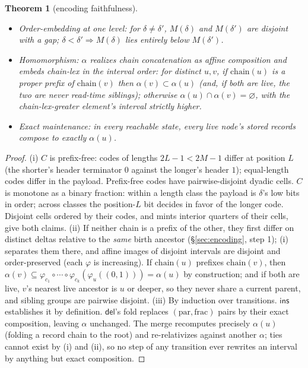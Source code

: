 \documentclass[11pt]{article}
\newtheorem{theorem}{Theorem}
\newcommand{\del}{\mathsf{del}}
\newcommand{\ins}{\mathsf{ins}}
\newcommand{\chain}{\mathrm{chain}}
\begin{document}
\begin{theorem}[encoding faithfulness]\label{thm:faithful}
\begin{itemize}
\item[(i)] \emph{Order-embedding at one level:} for $\delta \ne
\delta'$, $M(\delta)$ and $M(\delta')$ are disjoint with a gap;
$\delta < \delta' \Rightarrow M(\delta)$ lies entirely below
$M(\delta')$.
\item[(ii)] \emph{Homomorphism:} $\alpha$ realizes chain
concatenation as affine composition and embeds chain-lex in the
interval order: for distinct $u, v$, if $\chain(u)$ is a proper
prefix of $\chain(v)$ then $\alpha(v) \subset \alpha(u)$ (and, if
both are live, the two are never read-time siblings); otherwise
$\alpha(u) \cap \alpha(v) = \varnothing$, with the chain-lex-greater
element's interval strictly higher.
\item[(iii)] \emph{Exact maintenance:} in every reachable state,
every live node's stored records compose to exactly $\alpha(u)$.
\end{itemize}
\end{theorem}
\begin{proof}
(i) $C$ is prefix-free: codes of lengths $2L{-}1 < 2M{-}1$ differ at
position $L$ (the shorter's header terminator $0$ against the longer's
header $1$); equal-length codes differ in the payload. Prefix-free
codes have pairwise-disjoint dyadic cells. $C$ is monotone as a binary
fraction: within a length class the payload is $\delta$'s low bits in
order; across classes the position-$L$ bit decides in favor of the
longer code. Disjoint cells ordered by their codes, and mints interior
quarters of their cells, give both claims.
(ii) If neither chain is a prefix of the other, they first differ on
distinct deltas relative to the \emph{same} birth ancestor
(\S\ref{sec:encoding}, step 1); (i) separates them there, and affine
images of disjoint intervals are disjoint and order-preserved (each
$\varphi$ is increasing). If $\chain(u)$ prefixes $\chain(v)$, then
$\alpha(v) \subseteq \varphi_{c_1} \circ \cdots \circ
\varphi_{c_k}(\varphi_u((0,1))) = \alpha(u)$ by construction; and if
both are live, $v$'s nearest live ancestor is $u$ or deeper, so
they never share a current parent, and sibling groups are pairwise
disjoint.
(iii) By induction over transitions. $\ins$ establishes it by
definition. $\del$'s fold replaces $(\mathrm{par}, \mathrm{frac})$
pairs by their exact composition, leaving $\alpha$ unchanged. The merge
recomputes precisely $\alpha(u)$ (folding a record chain to the root)
and re-relativizes against another $\alpha$; ties cannot exist by
(i) and (ii), so no step of any transition ever rewrites an interval
by anything but exact composition.
\end{proof}
\end{document}
